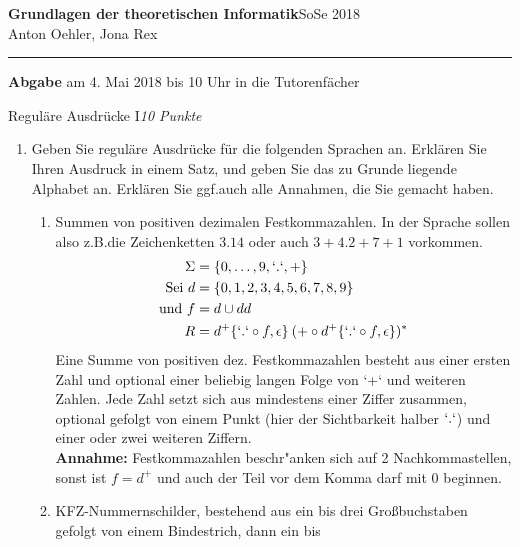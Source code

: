 \documentclass[a4paper,twoside,12pt,fleqn]{article}
\newcommand{\ABGABEDATUM}{am 4. Mai 2018 bis 10 Uhr in die
Tutorenf\"acher}
\newcounter{AUFGNR}
\newcommand{\AUFGABE}[2]{\vspace{0.3cm}\item[Aufgabe~\arabic{AUFGNR}]\stepcounter{AUFGNR} #1\hfill\emph{#2}}
\begin{document}
\pagestyle{empty}

\noindent
\large
\textbf{Grundlagen der theoretischen Informatik}\hfill SoSe 2018 \\[0.5ex]
\normalsize
Anton Oehler, Jona Rex

\medskip\hrule

\smallskip
\noindent
\textbf{Abgabe} \ABGABEDATUM



\begin{description}
	\AUFGABE{Regul\"are Ausdr\"ucke I}{10 Punkte}

	\begin{enumerate}
		\item
		      Geben Sie regul\"are Ausdr\"ucke f\"ur die folgenden Sprachen an.
		      Erkl\"aren Sie Ihren Ausdruck in einem Satz, und geben Sie das zu
		      Grunde liegende Alphabet an. Erkl\"aren Sie ggf.\@ auch alle
		      Annahmen, die Sie gemacht haben.
		      \begin{enumerate}
			      \item Summen von positiven dezimalen Festkommazahlen.
			            In der Sprache sollen also z.B.\@ die Zeichenketten
                  $3.14$ oder auch $3+4.2+7+1$ vorkommen.
                  \begin{align*}
                    \Sigma &= \{0, \dots, 9, `.`, +\}\\
                    \text{Sei } d &= \{0,1,2,3,4,5,6,7,8,9\}\\
                    \text{und } f &= d \cup dd\\
                    R &= d^+\{`.` \circ f, \epsilon\} \> (+ \circ d^+\{`.` \circ f, \epsilon\})^*
                  \end{align*}
                  Eine Summe von positiven dez. Festkommazahlen besteht aus einer ersten Zahl
                  und optional einer beliebig langen Folge von `+` und weiteren Zahlen.
                  Jede Zahl setzt sich aus mindestens einer Ziffer zusammen, optional gefolgt
                  von einem Punkt (hier der Sichtbarkeit halber $`.`$) und einer oder zwei
                  weiteren Ziffern.\\
                  \textbf{Annahme:} Festkommazahlen beschr"anken sich auf 2 Nachkommastellen, sonst ist
                  $f = d^+$ und auch der Teil vor dem Komma darf mit $0$ beginnen.
			      \item KFZ-Nummernschilder, bestehend aus ein bis drei Gro\ss{}buchstaben
			            gefolgt von einem Bindestrich, dann ein bis

\end{enumerate}
\end{enumerate}
\end{description}
\end{document}
